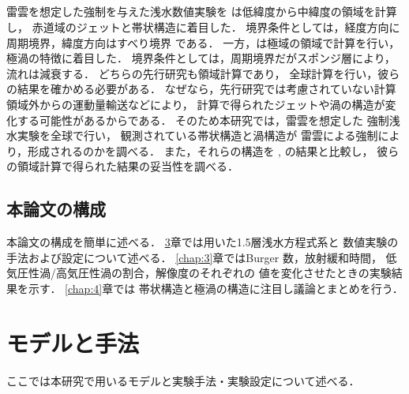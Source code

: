 \documentclass[a4j,12pt,openbib,oneside]{jreport}
\begin{document}
\section{}
\label{sec:intro3}
雷雲を想定した強制を与えた浅水数値実験を
\cite{Showman2007}は低緯度から中緯度の領域を計算し，
赤道域のジェットと帯状構造に着目した．
境界条件としては，経度方向に周期境界，緯度方向はすべり境界 である．
%
一方，\cite{Brueshaber2019}は極域の領域で計算を行い，
極渦の特徴に着目した．
境界条件としては，周期境界だがスポンジ層により，流れは減衰する．
%
どちらの先行研究も領域計算であり，
全球計算を行い，彼らの結果を確かめる必要がある．
なぜなら，先行研究では考慮されていない計算領域外からの運動量輸送などにより，
計算で得られたジェットや渦の構造が変化する可能性があるからである．
%
%
%
そのため本研究では，雷雲を想定した
強制浅水実験を全球で行い，
観測されている帯状構造と渦構造が
雷雲による強制により，形成されるのかを調べる．
%
また，それらの構造を
\cite{Showman2007}, \cite{Brueshaber2019} の結果と比較し，
彼らの領域計算で得られた結果の妥当性を調べる．
%
\def\intro4{本論文の構成}
\section{\intro4}
\label{sec:intro4}
本論文の構成を簡単に述べる．
\ref{chap:2}章では用いた1.5層浅水方程式系と
数値実験の手法および設定について述べる．
\ref{chap:3}章ではBurger 数，放射緩和時間，
低気圧性渦/高気圧性渦の割合，解像度のそれぞれの
値を変化させたときの実験結果を示す．
\ref{chap:4}章では
帯状構造と極渦の構造に注目し議論とまとめを行う．
%
%
\setcounter{table}{0}
\def\chap2{モデルと手法}
\chapter{\chap2}
\label{chap:2}
\markright{2 \chap2}
ここでは本研究で用いるモデルと実験手法・実験設定について述べる．
\end{document}
